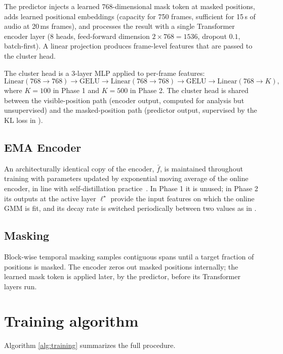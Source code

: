 \documentclass[9pt,twocolumn]{article}
\theoremstyle{plain}
\theoremstyle{definition}
\theoremstyle{remark}
\begin{document}
The predictor injects a learned 768-dimensional mask token at masked positions, adds learned positional embeddings (capacity for 750 frames, sufficient for 15\,s of audio at 20\,ms frames), and processes the result with a single Transformer encoder layer (8 heads, feed-forward dimension $2 \times 768 = 1536$, dropout $0.1$, batch-first). A linear projection produces frame-level features that are passed to the cluster head.

The cluster head is a 3-layer MLP applied to per-frame features:
\begin{equation*}
\mathrm{Linear}(768 \to 768) \to \mathrm{GELU} \to \mathrm{Linear}(768 \to 768) \to \mathrm{GELU} \to \mathrm{Linear}(768 \to K),
\end{equation*}
where $K\!=\!100$ in Phase 1 and $K\!=\!500$ in Phase 2. The cluster head is shared between the visible-position path (encoder output, computed for analysis but unsupervised) and the masked-position path (predictor output, supervised by the KL loss in ).

\subsection{EMA Encoder}

An architecturally identical copy of the encoder, $\bar{f}$, is maintained throughout training with parameters updated by exponential moving average of the online encoder, in line with self-distillation practice~\citep{grill2020byol, baevski2022data2vec}. In Phase 1 it is unused; in Phase 2 its outputs at the active layer $\ell^\star$ provide the input features on which the online GMM is fit, and its decay rate is switched periodically between two values as in .

\subsection{Masking}

Block-wise temporal masking samples contiguous spans until a target fraction of positions is masked. The encoder zeros out masked positions internally; the learned mask token is applied later, by the predictor, before its Transformer layers run.

\section{Training algorithm}
Algorithm \ref{alg:training} summarizes the full procedure.
\end{document}
